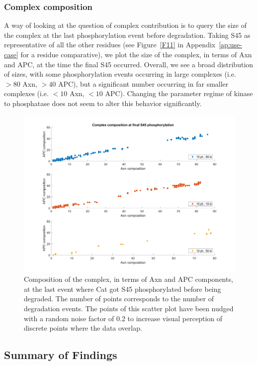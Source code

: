 \subsubsection*{Complex composition}

A way of looking at the question of complex contribution is to query
the size of the complex at the last phosphorylation event before
degradation. Taking S45 as representative of all the other residues
(see Figure~\ref{F11} in Appendix~\ref{ap:use-case} for a residue comparative),
we plot the size of the complex, in terms of Axn and APC, at the time
the final S45 occurred. Overall, we see a broad distribution of sizes,
with some phosphorylation events occurring in large complexes
(i.e. $>80$ Axn, $>40$ APC), but a significant number occurring in far
smaller complexes (i.e. $<10$ Axn, $<10$ APC). Changing the parameter
regime of kinase to phosphatase does not seem to alter this behavior
significantly.

\begin{figure}[h]
  \centering
  \includegraphics[width=\columnwidth]{wnt/F6_complex_composition_final_S45.png}
  \caption{Composition of the complex, in terms of Axn and APC
    components, at the last event where Cat got S45 phosphorylated
    before being degraded. The number of points corresponds to the number of
    degradation events. The points of this scatter plot have
    been nudged with a random noise factor of 0.2 to increase visual
    perception of discrete points where the data overlap.}
  \label{F6}
\end{figure}


\subsection{Summary of Findings}

